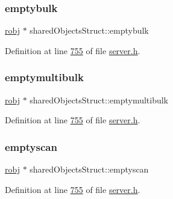 \mbox{\label{structsharedObjectsStruct_aea656bed1c1e5d4f86aa24fc7b01c114}} 
\subsubsection{\texorpdfstring{emptybulk}{emptybulk}}
{\footnotesize\ttfamily \hyperlink{structredisObject}{robj} $\ast$ shared\+Objects\+Struct\+::emptybulk}



Definition at line \hyperlink{server_8h_source_l00755}{755} of file \hyperlink{server_8h_source}{server.\+h}.

\mbox{\label{structsharedObjectsStruct_ad2e6fe87786130af9533cc74278fdc0b}} 
\subsubsection{\texorpdfstring{emptymultibulk}{emptymultibulk}}
{\footnotesize\ttfamily \hyperlink{structredisObject}{robj} $\ast$ shared\+Objects\+Struct\+::emptymultibulk}



Definition at line \hyperlink{server_8h_source_l00755}{755} of file \hyperlink{server_8h_source}{server.\+h}.

\mbox{\label{structsharedObjectsStruct_aedf1a090f1704f5601e22ed66376362e}} 
\subsubsection{\texorpdfstring{emptyscan}{emptyscan}}
{\footnotesize\ttfamily \hyperlink{structredisObject}{robj} $\ast$ shared\+Objects\+Struct\+::emptyscan}



Definition at line \hyperlink{server_8h_source_l00755}{755} of file \hyperlink{server_8h_source}{server.\+h}.

